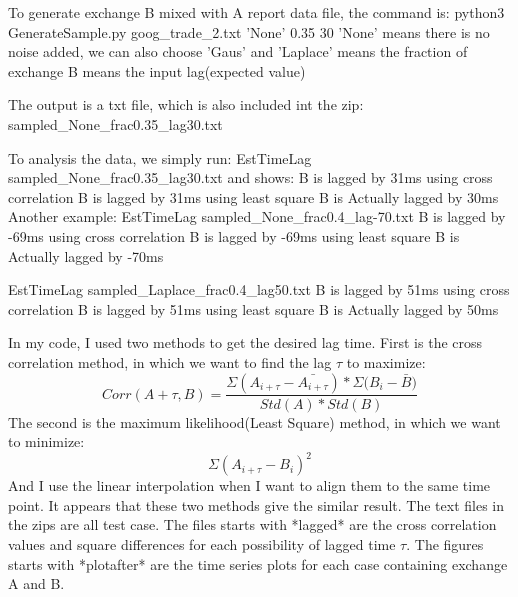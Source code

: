 \documentclass[12pt,a4paper]{article}
\begin{document}
To generate exchange B mixed with A report data file, the command is:
python3 GenerateSample.py goog\_trade\_2.txt 'None' 0.35 30 \newline
'None' means there is no noise added, we can also choose 'Gaus' and 'Laplace'  means the fraction of exchange B  means the input lag(expected value) \newline

The output is a txt file, which is also included int the zip:
sampled\_None\_frac0.35\_lag30.txt \newline

To analysis the data, we simply run:
EstTimeLag sampled\_None\_frac0.35\_lag30.txt \newline
and shows:
B is lagged by 31ms using cross correlation\newline
B is lagged by 31ms using least square\newline
B is Actually lagged by 30ms\newline
\newline
Another example:
EstTimeLag sampled\_None\_frac0.4\_lag-70.txt\newline
B is lagged by -69ms using cross correlation\newline
B is lagged by -69ms using least square\newline
B is Actually lagged by -70ms\newline

EstTimeLag sampled\_Laplace\_frac0.4\_lag50.txt\newline
B is lagged by 51ms using cross correlation\newline
B is lagged by 51ms using least square\newline
B is Actually lagged by 50ms\newline

In my code, I used two methods to get the desired lag time. First is the cross correlation method, in which we want to find the lag $\tau$ to maximize:
\[
Corr(A+\tau , B) = \frac{\Sigma{(A_{i+\tau} - \bar{A_{i+\tau}})}*\Sigma{(B_i - \bar{B}})}{Std(A)*Std(B)}
\]
The second is the maximum likelihood(Least Square) method, in which we want to minimize:
\[
\Sigma{(A_{i+\tau}-B_{i})^{2}}
\]
And I use the linear interpolation when I want to align them to the same time point.
It appears that these two methods give the similar result. \newline
The text files in the zips are all test case. \newline
The files starts with *lagged* are the cross correlation values and square differences for each possibility of lagged time $\tau$.\newline
The figures starts with *plotafter* are the time series plots for each case containing exchange A and B.\newline
\end{document}
